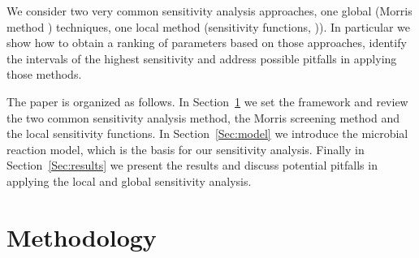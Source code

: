 \documentclass[a4paper, 12pt]{article}
\begin{document}
We consider two very common sensitivity analysis approaches, one global (Morris method \cite{Morris1991, Montague1992, Saltelli2006}) techniques, one local method (sensitivity functions, \cite{Banks2007a, Banks2010})). In particular we show how to obtain a ranking of parameters based on those approaches, identify the intervals of the highest sensitivity and address possible pitfalls in applying those methods. 


\smallskip

%


The paper is organized as follows. In Section~\ref{Sec:methodology}  we set the framework and review the two common sensitivity analysis method, the Morris screening method and the local sensitivity functions. In Section~\ref{Sec:model} we introduce the microbial reaction model, which is the basis for our sensitivity analysis. Finally in Section~\ref{Sec:results} we present the results and discuss potential pitfalls in applying the local and global sensitivity analysis.


\section{Methodology}\label{Sec:methodology}
\end{document}
